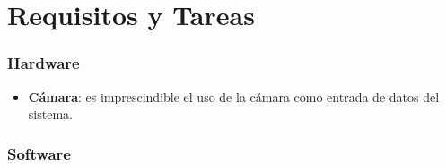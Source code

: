 \chapter{\textbf{Requisitos y Tareas}}
\label{chapter:requisitos}

\subsection*{Hardware}
{}
\vspace{5mm}

\begin{itemize}
    \item \textbf{Cámara}: es imprescindible el uso de la cámara como entrada de datos del sistema.
\end{itemize}

\subsection*{Software}
{}
\vspace{5mm}

